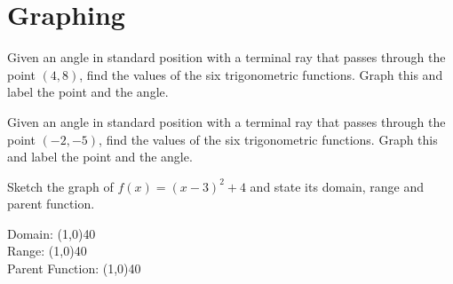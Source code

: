 \documentclass[../main.tex]{subfiles}
\begin{document}
\section*{Graphing}
    \begin{questions}
    \setcounter{question}{71}
   
    \question[1] Given an angle in standard position with a terminal ray that passes through the point $(4,8)$, find the values of the six trigonometric functions. Graph this and label the point and the angle.

        \begin{left} 
        \end{left} 
        
    \question[1] Given an angle in standard position with a terminal ray that passes through the point $(-2,-5)$, find the values of the six trigonometric functions. Graph this and label the point and the angle.

        \begin{left} 
        \end{left} 
    
    \question[1] Sketch the graph of $f(x) = (x-3)^2 + 4$ and state its domain, range and parent function.
    
        \begin{left} 
        \end{left}
        
    Domain: \line(1,0){40} \\
    \newline
    Range: \line(1,0){40} \\
    \newline
    Parent Function: \line(1,0){40} \\
    

\end{questions}
\end{document}
